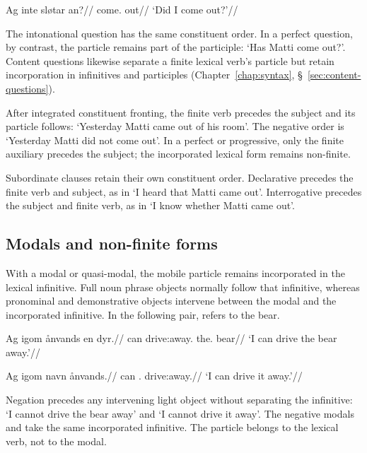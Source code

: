 \pex
\begingl
\gla Ag inte sløtar an?//
\glb \First{}\Sg{} \Q{} come.\Pst{} out//
\glft `Did I come out?'//
\endgl
\xe

The intonational question  has the same constituent order. In a perfect question, by contrast, the particle remains part of the participle:  `Has Matti come out?'. Content questions likewise separate a finite lexical verb's particle but retain incorporation in infinitives and participles (Chapter~\ref{chap:syntax}, \S~\ref{sec:content-questions}).

After integrated constituent fronting, the finite verb precedes the subject and its particle follows:  `Yesterday Matti came out of his room'. The negative order is  `Yesterday Matti did not come out'. In a perfect or progressive, only the finite auxiliary precedes the subject; the incorporated lexical form remains non-finite.

Subordinate clauses retain their own constituent order. Declarative  precedes the finite verb and subject, as in  `I heard that Matti came out'. Interrogative  precedes the subject and finite verb, as in  `I know whether Matti came out'.

\subsection{Modals and non-finite forms}
\label{sec:particle-modals}

With a modal or quasi-modal, the mobile particle remains incorporated in the lexical infinitive. Full noun phrase objects normally follow that infinitive, whereas pronominal and demonstrative objects intervene between the modal and the incorporated infinitive. In the following pair,  refers to the bear.

\pex
\begingl
\gla Ag igom ånvands en dyr.//
\glb \First{}\Sg{} can drive:away.\Inf{} the.\M{} bear//
\glft `I can drive the bear away.'//
\endgl
\xe

\pex
\begingl
\gla Ag igom navn ånvands.//
\glb \First{}\Sg{} can \Third{}\Sg{}.\Acc{} drive:away.\Inf{}//
\glft `I can drive it away.'//
\endgl
\xe

Negation precedes any intervening light object without separating the infinitive:  `I cannot drive the bear away' and  `I cannot drive it away'. The negative modals  and  take the same incorporated infinitive. The particle belongs to the lexical verb, not to the modal.

